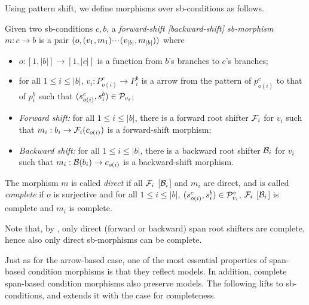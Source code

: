 Using pattern shift, we define morphisms over sb-conditions as follows.
%
\begin{definition}
  Given two sb-conditions $c,b$, a \emph{forward-shift [backward-shift] sb-morphism} $m:c\to b$ is a pair $(o,(v_1,m_1){\cdotp\mkern-2mu\cdotp\mkern-2mu\cdotp\mkern1mu} (v_{|b|},m_{|b|}))$ where
  \begin{itemize}[topsep=\smallskipamount]
  \item $o:[1,|b|]\to [1,|c|]$ is a function from $b$'s branches to $c$'s branches;
  \item for all $1\leq i\leq |b|$, $v_i:P^c_{o(i)}\to P^b_i$ is a arrow from the pattern of $p^c_{o(i)}$ to that of $p^b_i$ such that $(s^c_{o(i)},s^b_i)\in \mathcal{P}_{v_i}$;
  \item \emph{Forward shift:} for all $1\leq i\leq |b|$, there is a forward root shifter $\mathcal{F}_i$ for $v_i$ such that $m_i:b_i \rightarrow \mathcal{F}_i(c_{o(i)})$ is a forward-shift morphism;
  \item \emph{Backward shift:} for all $1\leq i\leq |b|$, there is a backward root shifter $\mathcal{B}_i$ for $v_i$ such that $m_i:\mathcal{B}(b_i) \rightarrow  c_{o(i)}$ is a backward-shift morphism.
  \end{itemize}
  The morphism $m$ is called \emph{direct} if all $\mathcal{F}_i$ [$\mathcal{B}_i$] and $m_i$ are direct, and is called \emph{complete} if $o$ is surjective and for all $1\leq i\leq |b|$, $(s^c_{o(i)},s^b_i)\in \mathcal{P}^\circ_{v_i}$, $\mathcal{F}_i$ [$\mathcal{B}_i$] is complete and $m_i$ is complete.
\end{definition}
%
Note that, by , only direct (forward or backward) span root shifters are complete, hence also only direct sb-morphisms can be complete.

Just as for the arrow-based case, one of the most essential properties of span-based condition morphisms is that they reflect models. In addition, complete span-based condition morphisms also preserve models. The following lifts  to sb-conditions, and extends it with the case for completeness.

